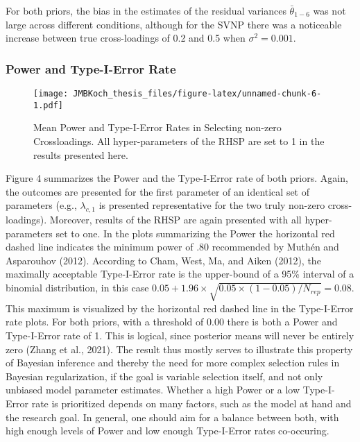 \documentclass[
  man, donotrepeattitle,floatsintext]{apa6}
\begin{document}
For both priors, the bias in the estimates of the residual variances \(\bar{\theta}_{1-6}\) was not large across different conditions, although for the SVNP there was a noticeable increase between true cross-loadings of 0.2 and 0.5 when \(\sigma^2 = 0.001\).

\hypertarget{power-and-type-i-error-rate-1}{%
\subsubsection{Power and Type-I-Error Rate}\label{power-and-type-i-error-rate-1}}

\begin{figure}
\centering
\texttt{[image: JMBKoch\_thesis\_files/figure-latex/unnamed-chunk-6-1.pdf]}
\caption{\label{fig:unnamed-chunk-6}Mean Power and Type-I-Error Rates in Selecting non-zero Crossloadings. All hyper-parameters of the RHSP are set to 1 in the results presented here.}
\end{figure}

Figure 4 summarizes the Power and the Type-I-Error rate of both priors. Again, the outcomes are presented for the first parameter of an identical set of parameters (e.g., \(\lambda_{c,1}\) is presented representative for the two truly non-zero cross-loadings). Moreover, results of the RHSP are again presented with all hyper-parameters set to one. In the plots summarizing the Power the horizontal red dashed line indicates the minimum power of .80 recommended by Muthén and Asparouhov (2012). According to Cham, West, Ma, and Aiken (2012), the maximally acceptable Type-I-Error rate is the upper-bound of a 95\% interval of a binomial distribution, in this case \(0.05 + 1.96 \times \sqrt{0.05 \times (1-0.05)/ N_{rep}} = 0.08\). This maximum is visualized by the horizontal red dashed line in the Type-I-Error rate plots. For both priors, with a threshold of 0.00 there is both a Power and Type-I-Error rate of 1. This is logical, since posterior means will never be entirely zero (Zhang et al., 2021). The result thus mostly serves to illustrate this property of Bayesian inference and thereby the need for more complex selection rules in Bayesian regularization, if the goal is variable selection itself, and not only unbiased model parameter estimates. Whether a high Power or a low Type-I-Error rate is prioritized depends on many factors, such as the model at hand and the research goal. In general, one should aim for a balance between both, with high enough levels of Power and low enough Type-I-Error rates co-occuring.
\end{document}
